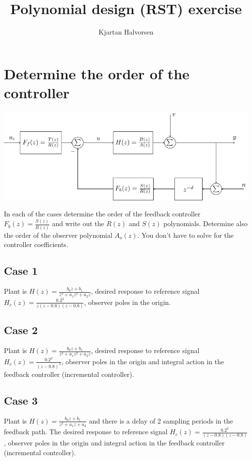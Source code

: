 \documentclass[letterpaper,fleqn]{scrartcl}
\author{Kjartan Halvorsen}
\date{}
\title{Polynomial design (RST) exercise}
\begin{document}
\maketitle

\section*{Determine the order of the controller}
\label{sec:org6e78179}
\begin{center}
\includegraphics[width=0.7\linewidth]{../../figures/2dof-block-explicit}
\end{center}
In each of the cases determine the order of the feedback controller \(F_{b}(z)=\frac{S(z)}{R(z)}\) and write out the \(R(z)\) and \(S(z)\) polynomials. Determine also the order of the observer polynomial \(A_o(z)\). You don't have to solve for the controller coefficients.

\subsection*{Case 1}
\label{sec:orgb815efe}
Plant is \(H(z) = \frac{b_0z+b_1}{z^3  + a_1z^2 + a_2z}\),  desired response to reference signal \(H_c(z) = \frac{0.2^2}{z(z-0.8)(z-0.8)}\), observer poles in the origin.

\vspace*{27mm}

\subsection*{Case 2}
\label{sec:org6948edd}
Plant is \(H(z) = \frac{b_0z+b_1}{z^3  + a_1z^2 + a_2z}\),  desired response to reference signal \(H_c(z) = \frac{0.2^2}{(z-0.8)^3}\), observer poles in the origin and integral action in the feedback controller (incremental controller).


\vspace*{27mm}


\subsection*{Case 3}
\label{sec:orgef90a48}
Plant is \(H(z) = \frac{b_0z+b_1}{z^2  + a_1z + a_2}\) and there is a delay of 2 sampling periods in the feedback path. The desired response to reference signal \(H_c(z) = \frac{0.2^2}{(z-0.8)(z-0.8)}\), observer poles in the origin and integral action in the feedback controller (incremental controller).
\end{document}
